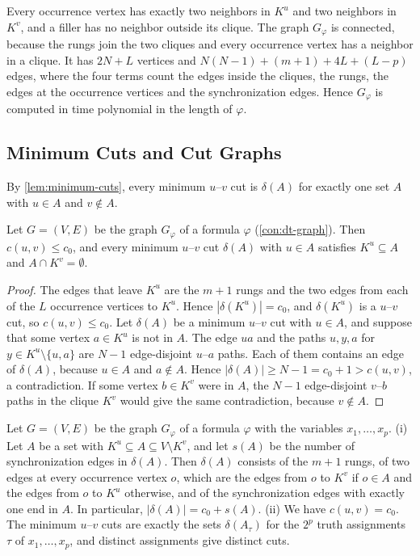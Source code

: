 Every occurrence vertex has exactly two neighbors in $K^u$ and two neighbors in $K^v$, and a filler has no neighbor outside its clique.
The graph $G_\varphi$ is connected, because the rungs join the two cliques and every occurrence vertex has a neighbor in a clique.
It has $2N + L$ vertices and $N(N - 1) + (m + 1) + 4L + (L - p)$ edges, where the four terms count the edges inside the cliques, the rungs, the edges at the occurrence vertices and the synchronization edges.
Hence $G_\varphi$ is computed in time polynomial in the length of $\varphi$.

\subsection{Minimum Cuts and Cut Graphs}
\label{sec:dt-correctness}

By \cref{lem:minimum-cuts}, every minimum $u$--$v$ cut is $\delta(A)$ for exactly one set $A$ with $u \in A$ and $v \notin A$.

\begin{lemma}[Forcing]
\label{lem:dt-forcing}
Let $G = (V, E)$ be the graph $G_\varphi$ of a formula $\varphi$ (\cref{con:dt-graph}).
Then $c(u, v) \leq c_0$, and every minimum $u$--$v$ cut $\delta(A)$ with $u \in A$ satisfies $K^u \subseteq A$ and $A \cap K^v = \emptyset$.
\end{lemma}

\begin{proof}
The edges that leave $K^u$ are the $m + 1$ rungs and the two edges from each of the $L$ occurrence vertices to $K^u$.
Hence $|\delta(K^u)| = c_0$, and $\delta(K^u)$ is a $u$--$v$ cut, so $c(u, v) \leq c_0$.
Let $\delta(A)$ be a minimum $u$--$v$ cut with $u \in A$, and suppose that some vertex $a \in K^u$ is not in $A$.
The edge $ua$ and the paths $u, y, a$ for $y \in K^u \setminus \{u, a\}$ are $N - 1$ edge-disjoint $u$--$a$ paths.
Each of them contains an edge of $\delta(A)$, because $u \in A$ and $a \notin A$.
Hence $|\delta(A)| \geq N - 1 = c_0 + 1 > c(u, v)$, a contradiction.
If some vertex $b \in K^v$ were in $A$, the $N - 1$ edge-disjoint $v$--$b$ paths in the clique $K^v$ would give the same contradiction, because $v \notin A$.
\end{proof}

\begin{lemma}
\label{lem:dt-cuts}
Let $G = (V, E)$ be the graph $G_\varphi$ of a formula $\varphi$ with the variables $x_1, \dots, x_p$.
(i) Let $A$ be a set with $K^u \subseteq A \subseteq V \setminus K^v$, and let $s(A)$ be the number of synchronization edges in $\delta(A)$.
Then $\delta(A)$ consists of the $m + 1$ rungs, of two edges at every occurrence vertex $o$, which are the edges from $o$ to $K^v$ if $o \in A$ and the edges from $o$ to $K^u$ otherwise, and of the synchronization edges with exactly one end in $A$.
In particular, $|\delta(A)| = c_0 + s(A)$.
(ii) We have $c(u, v) = c_0$.
The minimum $u$--$v$ cuts are exactly the sets $\delta(A_\tau)$ for the $2^p$ truth assignments $\tau$ of $x_1, \dots, x_p$, and distinct assignments give distinct cuts.
\end{lemma}

